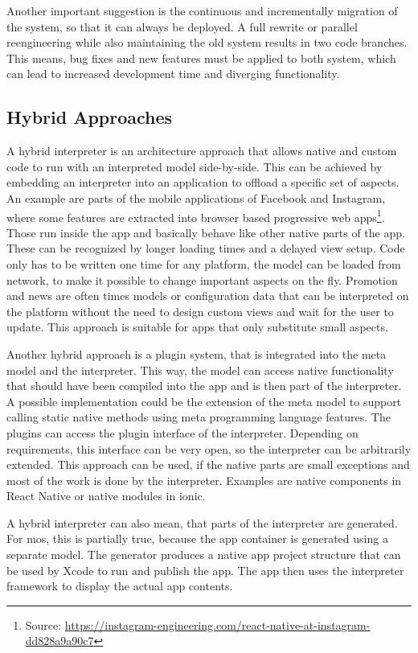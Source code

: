 Another important suggestion is the continuous and incrementally migration of the system, so that it can always be deployed.
A full rewrite or parallel reengineering while also maintaining the old system results in two code branches.
This means, bug fixes and new features must be applied to both system, which can lead to increased development time and diverging functionality.

\subsection{Hybrid Approaches}

A hybrid interpreter is an architecture approach that allows native and custom code to run with an interpreted model side-by-side.
This can be achieved by embedding an interpreter into an application to offload a specific set of aspects.
An example are parts of the mobile applications of Facebook and Instagram, where some features are extracted into browser based progressive web apps\footnote{Source: \url{https://instagram-engineering.com/react-native-at-instagram-dd828a9a90c7}}.
Those run inside the app and basically behave like other native parts of the app.
These can be recognized by longer loading times and a delayed view setup.
Code only has to be written one time for any platform, the model can be loaded from network, to make it possible to change important aspects on the fly.
Promotion and news are often times models or configuration data that can be interpreted on the platform without the need to design custom views and wait for the user to update.
This approach is suitable for apps that only substitute small aspects.

Another hybrid approach is a plugin system, that is integrated into the meta model and the interpreter.
This way, the model can access native functionality that should have been compiled into the app and is then part of the interpreter.
A possible implementation could be the extension of the meta model to support calling static native methods using meta programming language features.
The plugins can access the plugin interface of the interpreter.
Depending on requirements, this interface can be very open, so the interpreter can be arbitrarily extended.
This approach can be used, if the native parts are small exceptions and most of the work is done by the interpreter.
Examples are native components in React Native or native modules in ionic.

A hybrid interpreter can also mean, that parts of the interpreter are generated.
For mos, this is partially true, because the app container is generated using a separate model.
The generator produces a native app project structure that can be used by Xcode to run and publish the app.
The app then uses the interpreter framework to display the actual app contents.

